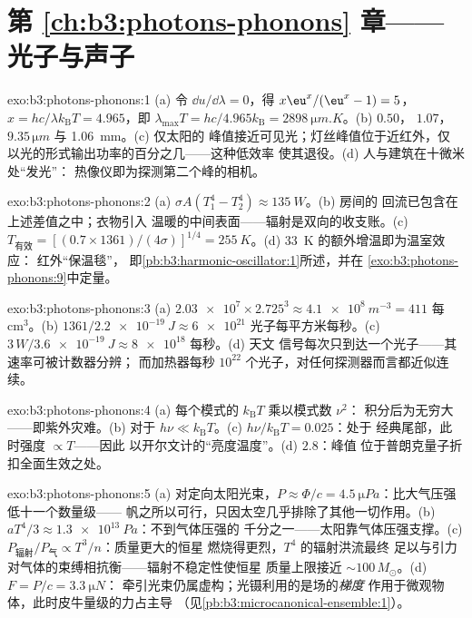 \section*{第 \ref{ch:b3:photons-phonons} 章——光子与声子}

\begin{solution}{exo:b3:photons-phonons:1}
(a) 令 $\dd u/\dd\lambda = 0$，得 $x\eu^x/(\eu^x - 1) = 5$，
$x = hc/\lambda k_{\text{B}}T = 4.965$，即 $\lambda_{\max}T =
hc/4.965k_{\text{B}} = \qty{2898}{\micro m.K}$。(b) $0.50$，
$1.07$，$9.35\,\unit{\micro m}$ 与 \qty{1.06}{mm}。(c) 仅太阳的
峰值接近可见光；灯丝峰值位于近红外，仅
以光的形式输出功率的百分之几——这种低效率
使其退役。(d) 人与建筑在十微米处“发光”：
热像仪即为探测第二个峰的相机。
\end{solution}

\begin{solution}{exo:b3:photons-phonons:2}
(a) $\sigma A(T_1^4 - T_2^4) \approx \qty{135}{W}$。(b) 房间的
回流已包含在上述差值之中；衣物引入
温暖的中间表面——辐射是双向的收支账。(c)
$T_{\text{有效}} = [(0.7 \times 1361)/(4\sigma)]^{1/4} =
\qty{255}{K}$。(d) \qty{33}{K} 的额外增温即为温室效应：
红外“保温毯”，
即\cref{pb:b3:harmonic-oscillator:1}所述，并在
\cref{exo:b3:photons-phonons:9}中定量。
\end{solution}

\begin{solution}{exo:b3:photons-phonons:3}
(a) $\num{2.03e7} \times 2.725^3 \approx \qty{4.1e8}{m^{-3}} =
411$ 每 cm$^3$。(b) $1361/\qty{2.2e-19}{J} \approx
\num{6e21}$ 光子每平方米每秒。(c) $3\,\unit{W}/
\qty{3.6e-19}{J} \approx \num{8e18}$ 每秒。(d) 天文
信号每次只到达一个光子——其速率可被计数器分辨；
而加热器每秒 $10^{22}$ 个光子，对任何探测器而言都近似连续。
\end{solution}

\begin{solution}{exo:b3:photons-phonons:4}
(a) 每个模式的 $k_{\text{B}}T$ 乘以模式数 $\nu^2$：
积分后为无穷大——即紫外灾难。(b) 对于 $h\nu \ll
k_{\text{B}}T$。(c) $h\nu/k_{\text{B}}T = 0.025$：处于
经典尾部，此时强度 $\propto T$——因此
以开尔文计的“亮度温度”。(d) $2.8$：峰值
位于普朗克量子折扣全面生效之处。
\end{solution}

\begin{solution}{exo:b3:photons-phonons:5}
(a) 对定向太阳光束，$P \approx \Phi/c =
\qty{4.5}{\micro Pa}$：比大气压强低十一个数量级——
帆之所以可行，只因太空几乎排除了其他一切作用。(b)
$aT^4/3 \approx \qty{1.3e13}{Pa}$：不到气体压强的
千分之一——太阳靠气体压强支撑。(c)
$P_{\text{辐射}}/P_{\text{气}} \propto T^3/n$：质量更大的恒星
燃烧得更烈，$T^4$ 的辐射洪流最终
足以与引力对气体的束缚相抗衡——辐射不稳定性使恒星
质量上限接近 $\sim100\,M_\odot$。(d) $F = P/c = \qty{3.3}{\micro N}$：
牵引光束仍属虚构；光镊利用的是场的\emph{梯度}
作用于微观物体，此时皮牛量级的力占主导
（见\cref{pb:b3:microcanonical-ensemble:1}）。
\end{solution}

